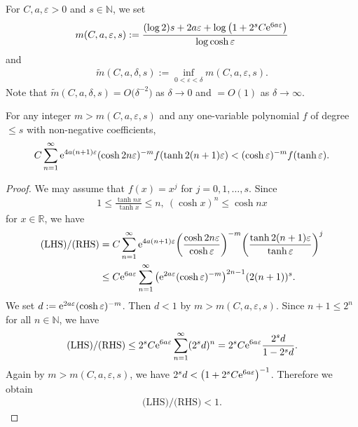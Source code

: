 For $C,a,\varepsilon > 0$ and $s \in \mathbb{N}$, we set
\begin{align*}%
m(C,a,\varepsilon,s) := \frac{(\log2)s + 2a\varepsilon + \log\big(1+2^{s}C{\rm e}^{6a\varepsilon}\big)}{\log\cosh\varepsilon}
\end{align*}
and
\begin{align*}
\tilde{m}(C,a,\delta,s) :=
\inf_{0<\varepsilon<\delta}m(C,a,\varepsilon,s).
\end{align*}
Note that $\tilde{m}(C,a,\delta,s)=O\big(\delta^{-2}\big)$ as $\delta\to 0$
and $=O(1)$ as $\delta\to \infty$.
\begin{Lemma}\label{koukou}
For any integer $m > m(C,a,\varepsilon,s)$
and any one-variable polynomial $f$ of degree $\leq s$ with non-negative coefficients,
\begin{gather*}
C\sum_{n=1}^{\infty}{\rm e}^{4a(n+1)\varepsilon}(\cosh 2n\varepsilon)^{-m}f(\tanh
2(n+1)\varepsilon) < (\cosh \varepsilon)^{-m}f(\tanh \varepsilon).
\end{gather*}
\end{Lemma}
\begin{proof}
We may assume that $f(x) = x^{j}$ for $j=0,1,\ldots,s$.
Since
\begin{gather*}
1\leq \frac{\tanh nx}{\tanh x} \leq n,\
(\cosh x)^{n} \leq \cosh nx
\end{gather*}
for $x\in\mathbb{R}$, we have
\begin{align*}
\text{(LHS)/(RHS)} &=
C\sum_{n=1}^{\infty}{\rm e}^{4a(n+1)\varepsilon}\bigg(\frac{\cosh 2n
\varepsilon}{\cosh \varepsilon}\bigg)^{-m}\bigg(\frac{\tanh
2(n+1)\varepsilon}{\tanh \varepsilon}\bigg)^j \nonumber
\\
&\leq C{\rm e}^{6a\varepsilon}\sum_{n=1}^{\infty}
\big({\rm e}^{2a\varepsilon}(\cosh \varepsilon)^{-m}\big)^{2n-1}(2(n+1))^s.
\end{align*}
We set $d:={\rm e}^{2a\varepsilon}(\cosh \varepsilon)^{-m}$.
Then $d<1$ by $m>m(C,a,\varepsilon,s)$. Since $n+1\leq 2^{n}$ for all $n\in\mathbb{N}$,
we have
\begin{gather*}
\text{(LHS)/(RHS)}\leq
2^{s}C{\rm e}^{6a\varepsilon}\sum_{n=1}^{\infty} (2^{s}d)^n
= 2^{s}C{\rm e}^{6a\varepsilon}\frac{2^{s}d}{1-2^{s}d}.
\end{gather*}
Again by $m > m(C,a,\varepsilon,s)$,
we have $2^{s}d<\big(1+2^{s}C{\rm e}^{6a\varepsilon}\big)^{-1}$.
Therefore we obtain
\begin{gather*}
\text{(LHS)/(RHS)}<1.\tag*{\qed}
\end{gather*}
\renewcommand{\qed}{}
\end{proof}
